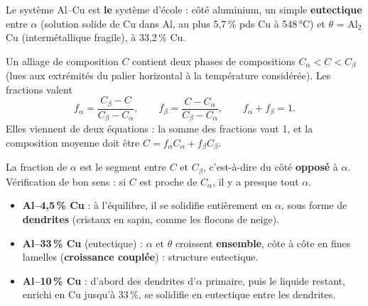 Le système Al--Cu est \textbf{le} système d'école : côté aluminium, un simple
\textbf{eutectique} entre $\alpha$ (solution solide de Cu dans Al, au plus 5,7\,\% pds Cu à
548\,°C) et $\theta$ = Al$_2$Cu (intermétallique fragile), à 33,2\,\% Cu.

\begin{thmbox}[title={La loi du levier (à connaître)}]
Un alliage de composition $C$ contient deux phases de compositions $C_\alpha < C < C_\beta$
(lues aux extrémités du palier horizontal à la température considérée). Les fractions valent
\[ f_\alpha = \frac{C_\beta - C}{C_\beta - C_\alpha}, \qquad
   f_\beta = \frac{C - C_\alpha}{C_\beta - C_\alpha}, \qquad f_\alpha + f_\beta = 1 . \]
Elles viennent de deux équations : la somme des fractions vaut 1, et la composition moyenne
doit être $C = f_\alpha C_\alpha + f_\beta C_\beta$.
\end{thmbox}


\begin{warnbox}[title={Le piège du levier}]
La fraction de $\alpha$ est le segment entre $C$ et $C_\beta$, c'est-à-dire du côté
\textbf{opposé} à $\alpha$. Vérification de bon sens : si $C$ est proche de $C_\alpha$, il y a
presque tout $\alpha$.
\end{warnbox}

\begin{propbox}[title={Trois alliages, trois microstructures}]
\begin{itemize}
  \item \textbf{Al--4,5\,\% Cu} : à l'équilibre, il se solidifie entièrement en $\alpha$, sous
        forme de \textbf{dendrites} (cristaux en sapin, comme les flocons de neige).
  \item \textbf{Al--33\,\% Cu} (eutectique) : $\alpha$ et $\theta$ croissent
        \textbf{ensemble}, côte à côte en fines lamelles (\textbf{croissance couplée}) :
        structure eutectique.
  \item \textbf{Al--10\,\% Cu} : d'abord des dendrites d'$\alpha$ primaire, puis le liquide
        restant, enrichi en Cu jusqu'à 33\,\%, se solidifie en eutectique entre les dendrites.
\end{itemize}
\end{propbox}


